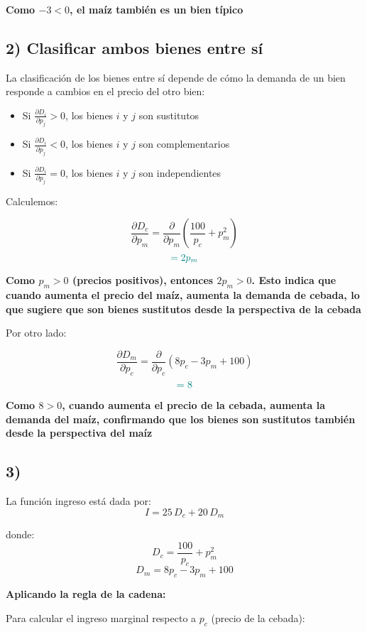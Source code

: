 \documentclass{article}
\begin{document}
\textbf{\color{teal}Como \(-3 < 0\), el maíz también es un bien típico}

\subsection*{2) Clasificar ambos bienes entre sí}

La clasificación de los bienes entre sí depende de cómo la demanda de un bien responde a cambios en el precio del otro bien:

\begin{itemize}
  \item Si \(\frac{\partial D_i}{\partial p_j} > 0\), los bienes \(i\) y \(j\) son sustitutos
  \item Si \(\frac{\partial D_i}{\partial p_j} < 0\), los bienes \(i\) y \(j\) son complementarios
  \item Si \(\frac{\partial D_i}{\partial p_j} = 0\), los bienes \(i\) y \(j\) son independientes
\end{itemize}

Calculemos:

\[
\frac{\partial D_c}{\partial p_m} = \frac{\partial}{\partial p_m}\left(\frac{100}{p_c} + p_m^2\right)
\]
\[
\color{teal}
= 2p_m
\]

\textbf{\color{teal}Como \(p_m > 0\) (precios positivos), entonces \(2p_m > 0\). Esto indica que cuando aumenta el precio del maíz, aumenta la demanda de cebada, lo que sugiere que son bienes sustitutos desde la perspectiva de la cebada}

Por otro lado:

\[
\frac{\partial D_m}{\partial p_c} = \frac{\partial}{\partial p_c}(8p_c - 3p_m + 100)
\]
\[
\color{teal}
= 8
\]

\textbf{\color{teal}Como \(8 > 0\), cuando aumenta el precio de la cebada, aumenta la demanda del maíz, confirmando que los bienes son sustitutos también desde la perspectiva del maíz}
\subsection*{3)}

La función ingreso está dada por:
\[
I = 25\,D_c + 20\,D_m
\]

donde:
\[
D_c = \frac{100}{p_c} + p_m^2
\]
\[
D_m = 8p_c - 3p_m + 100
\]

\textbf{Aplicando la regla de la cadena:}

Para calcular el ingreso marginal respecto a \(p_c\) (precio de la cebada):
\end{document}
